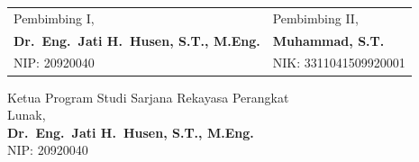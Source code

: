 \begin{singlespacing}
\vspace{1.0cm}

\begin{tabular}{>{\centering\arraybackslash}p{7cm} >{\centering\arraybackslash}p{7cm}}
  Pembimbing I, & Pembimbing II, \\[2.0cm]
  \textbf{Dr.~Eng.~Jati H.~Husen, S.T., M.Eng.} & \textbf{Muhammad, S.T.} \\
  NIP: 20920040 & NIK: 3311041509920001 \\
\end{tabular}

\vspace{1.0cm}

\begin{center}
  Ketua Program Studi Sarjana Rekayasa Perangkat\\
  Lunak,\\[2.0cm]
  \textbf{Dr.~Eng.~Jati H.~Husen, S.T., M.Eng.}\\
  NIP: 20920040
\end{center}

\end{singlespacing}
